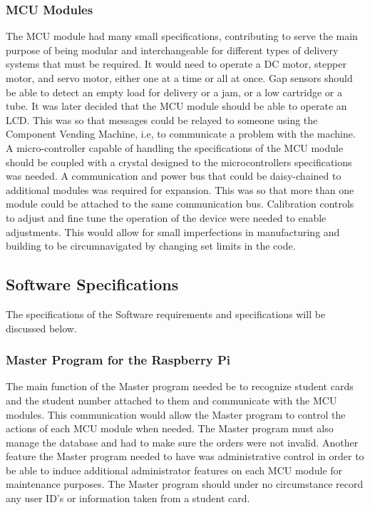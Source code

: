 \documentclass[a4paper,11pt]{article}
\numberwithin{figure}{section}
\numberwithin{table}{section}
\begin{document}
\subsubsection{MCU Modules}
The MCU module had many small specifications, contributing to serve the main purpose of being modular and interchangeable for different types of delivery systems that must be required. It would need to operate a DC motor, stepper motor, and servo motor, either one at a time or all at once. Gap sensors should be able to detect an empty load for delivery or a jam, or a low cartridge or a tube. It was later decided that the MCU module should be able to operate an LCD. This was so that messages could be relayed to someone using the Component Vending Machine, i.e, to communicate a problem with the machine. A micro-controller capable of handling the specifications of the MCU module should be coupled with a crystal designed to the microcontrollers specifications was needed. A communication and power bus that could be daisy-chained to additional modules was required for expansion. This was so that more than one module could be attached to the same communication bus. Calibration controls to adjust and fine tune the operation of the device were needed to enable adjustments. This would allow for small imperfections in manufacturing and building to be circumnavigated by changing set limits in the code.
\subsection{Software Specifications}
The specifications of the Software requirements and specifications will be discussed below.
\subsubsection{Master Program for the Raspberry Pi}
The main function of the Master program needed be to recognize student cards and the student number attached to them and communicate with the MCU modules. This communication would allow the Master program to control the actions of each MCU module when needed. The Master program must also manage the database and had to make sure the orders were not invalid. Another feature the Master program needed to have was administrative control in order to be able to induce additional administrator features on each MCU module for maintenance purposes. The Master program should under no circumstance record any user ID's or information taken from a student card.
\end{document}
